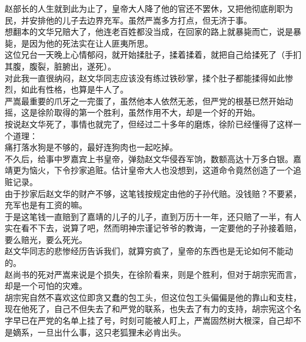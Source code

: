 \begin{multicols}{\theparacolNo}
赵部长的人生就到此为止了，皇帝大人降了他的官还不罢休，又把他彻底削职为民，并安排他的儿子去边界充军。虽然严嵩多方打点，但无济于事。\\

想翻本的文华兄赔大了，他连老百姓都没当成，在回家的路上就暴毙而亡，说是暴毙，是因为他的死法实在让人匪夷所思。\\

这位兄台一天晚上心情郁闷，就开始揉肚子，揉着揉着，就把自己给揉死了（手扪其腹，腹裂，脏腑出，遂死）。\\

对此我一直很纳闷，赵文华同志应该没有练过铁砂掌，揉个肚子都能揉得如此惨烈，如此有性格，也算是牛人了。\\

严嵩最重要的爪牙之一完蛋了，虽然他本人依然无恙，但严党的根基已然开始动摇，这是徐阶取得的第一个胜利，虽然作用不大，却是一个好的开始。\\

按说赵文华死了，事情也就完了，但经过二十多年的磨炼，徐阶已经懂得了这样一个道理：\\

痛打落水狗是不够的，最好连狗肉也一起吃掉。\\

不久后，给事中罗嘉宾上书皇帝，弹劾赵文华侵吞军饷，数额高达十万多白银。嘉靖更为恼火，下令抄家追赃。估计皇帝大人也没想到，这道命令竟然创造了一个追赃记录。\\

由于抄家后赵文华的财产不够，这笔钱按规定由他的子孙代赔。没钱赔？不要紧，充军也是有工资的嘛。\\

于是这笔钱一直赔到了嘉靖的儿子的儿子，直到万历十一年，还只赔了一半，有人实在看不下去，说算了吧，然而明神宗谨记爷爷的教诲，一定要他的子孙接着赔，要么赔光，要么死光。\\

赵文华同志的悲惨经历告诉我们，就算穷疯了，皇帝的东西也是无论如何不能动的。\\

赵尚书的死对严嵩来说是个损失，在徐阶看来，则是个胜利，但对于胡宗宪而言，却是一个可怕的灾难。\\

胡宗宪自然不喜欢这位即贪又蠢的包工头，但这位包工头偏偏是他的靠山和支柱，现在他死了，自己不但失去了和严党的联系，也失去了有力的支持，胡宗宪这个名字早已在严党的名单上挂了号，时刻可能被人盯上，严嵩固然树大根深，自己却不是嫡系，一旦出什么事，这只老狐狸未必肯出头。\\


\end{multicols}
